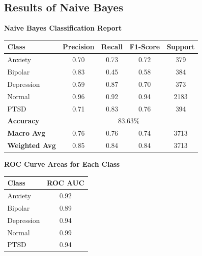 
\subsection{Results of Naive Bayes}

\begin{center}
    \textbf{Naive Bayes Classification Report} \\[0.5em]
    \begin{tabular}{|l|c|c|c|c|}
        \hline
        \textbf{Class} & \textbf{Precision} & \textbf{Recall} & \textbf{F1-Score} & \textbf{Support} \\ \hline
        Anxiety        & 0.70               & 0.73            & 0.72              & 379              \\ \hline
        Bipolar        & 0.83               & 0.45            & 0.58              & 384              \\ \hline
        Depression     & 0.59               & 0.87            & 0.70              & 373              \\ \hline
        Normal         & 0.96               & 0.92            & 0.94              & 2183             \\ \hline
        PTSD           & 0.71               & 0.83            & 0.76              & 394              \\ \hline
        \textbf{Accuracy} & \multicolumn{4}{|c|}{83.63\%} \\ \hline
        \textbf{Macro Avg} & 0.76            & 0.76            & 0.74              & 3713             \\ \hline
        \textbf{Weighted Avg} & 0.85         & 0.84            & 0.84              & 3713             \\ \hline
    \end{tabular}
\end{center}

\vspace{0.25em}

\begin{center}
    \textbf{ROC Curve Areas for Each Class} \\[0.5em]
    \begin{tabular}{|l|c|}
        \hline
        \textbf{Class}  & \textbf{ROC AUC} \\ \hline
        Anxiety         & 0.92            \\ \hline
        Bipolar         & 0.89            \\ \hline
        Depression      & 0.94            \\ \hline
        Normal          & 0.99            \\ \hline
        PTSD            & 0.94            \\ \hline
    \end{tabular}
\end{center}

